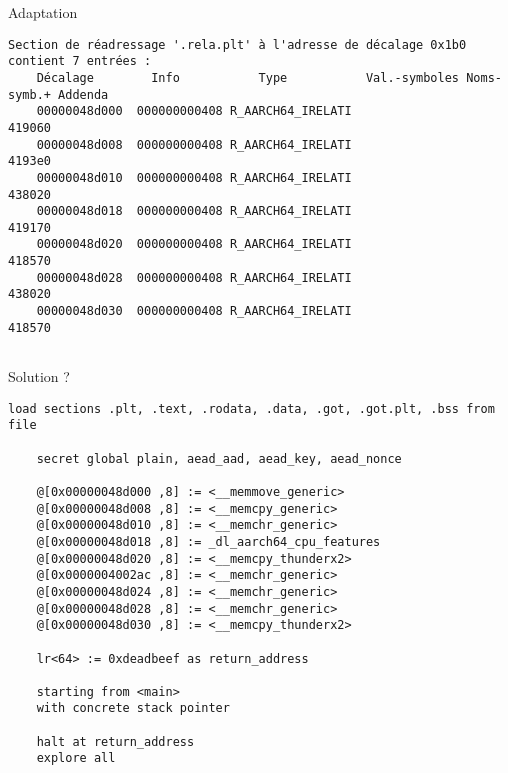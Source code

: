 \documentclass[A4,svgnames,9pt,aspectratio=169]{beamer}
\begin{document}

\begin{frame}[fragile]{Adaptation}
  \begin{lstlisting}[basicstyle=\footnotesize, caption={readelf -r}, gobble=4, frame=single, captionpos=b]
    Section de réadressage '.rela.plt' à l'adresse de décalage 0x1b0 contient 7 entrées :
    Décalage        Info           Type           Val.-symboles Noms-symb.+ Addenda
    00000048d000  000000000408 R_AARCH64_IRELATI                    419060
    00000048d008  000000000408 R_AARCH64_IRELATI                    4193e0
    00000048d010  000000000408 R_AARCH64_IRELATI                    438020
    00000048d018  000000000408 R_AARCH64_IRELATI                    419170
    00000048d020  000000000408 R_AARCH64_IRELATI                    418570
    00000048d028  000000000408 R_AARCH64_IRELATI                    438020
    00000048d030  000000000408 R_AARCH64_IRELATI                    418570
  
  \end{lstlisting}
\end{frame}


\begin{frame}[fragile]{Solution ?}
  \begin{lstlisting}[style=INIStyle, caption={script.ini}, gobble=4, basicstyle=\footnotesize]
    load sections .plt, .text, .rodata, .data, .got, .got.plt, .bss from file

    secret global plain, aead_aad, aead_key, aead_nonce
    
    @[0x00000048d000 ,8] := <__memmove_generic>
    @[0x00000048d008 ,8] := <__memcpy_generic>
    @[0x00000048d010 ,8] := <__memchr_generic>
    @[0x00000048d018 ,8] := _dl_aarch64_cpu_features
    @[0x00000048d020 ,8] := <__memcpy_thunderx2>
    @[0x0000004002ac ,8] := <__memchr_generic>
    @[0x00000048d024 ,8] := <__memchr_generic>
    @[0x00000048d028 ,8] := <__memchr_generic>
    @[0x00000048d030 ,8] := <__memcpy_thunderx2>
     
    lr<64> := 0xdeadbeef as return_address
    
    starting from <main>
    with concrete stack pointer
    
    halt at return_address
    explore all
  \end{lstlisting}
\end{frame}
\end{document}
